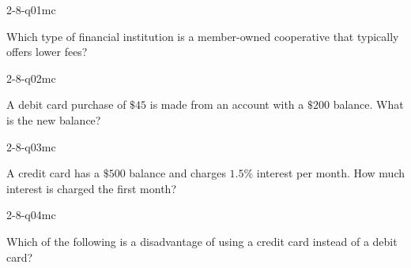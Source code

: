 

\begin{practiceQuestion}{2-8-q01}{mc}
\begin{questionText}
Which type of financial institution is a member-owned cooperative that typically offers lower fees?
\end{questionText}
\end{practiceQuestion}

\begin{practiceQuestion}{2-8-q02}{mc}
\begin{questionText}
A debit card purchase of $\$45$ is made from an account with a $\$200$ balance. What is the new balance?
\end{questionText}
\end{practiceQuestion}

\begin{practiceQuestion}{2-8-q03}{mc}
\begin{questionText}
A credit card has a $\$500$ balance and charges $1.5\%$ interest per month. How much interest is charged the first month?
\end{questionText}
\end{practiceQuestion}

\begin{practiceQuestion}{2-8-q04}{mc}
\begin{questionText}
Which of the following is a disadvantage of using a credit card instead of a debit card?
\end{questionText}
\end{practiceQuestion}

